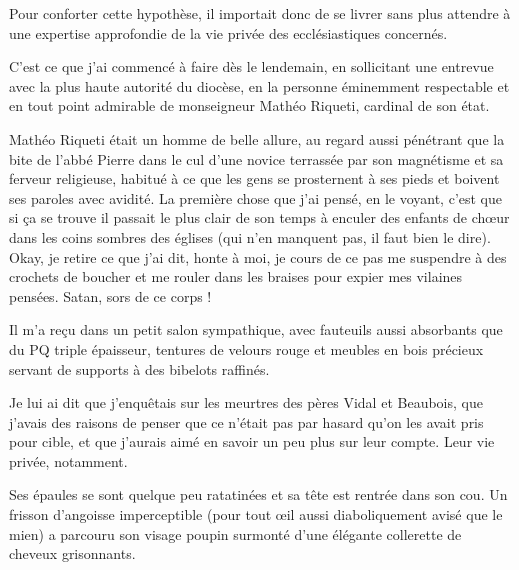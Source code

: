Pour conforter cette hypothèse, il importait donc de se livrer sans plus attendre à une expertise approfondie de la vie privée des ecclésiastiques concernés.

C’est ce que j’ai commencé à faire dès le lendemain, en sollicitant une entrevue avec la plus haute autorité du diocèse, en la personne éminemment respectable et en tout point admirable de monseigneur Mathéo Riqueti, cardinal de son état.

Mathéo Riqueti était un homme de belle allure, au regard aussi pénétrant que la bite de l’abbé Pierre dans le cul d’une novice terrassée par son magnétisme et sa ferveur religieuse, habitué à ce que les gens se prosternent à ses pieds et boivent ses paroles avec avidité. La première chose que j’ai pensé, en le voyant, c’est que si ça se trouve il passait le plus clair de son temps à enculer des enfants de chœur dans les coins sombres des églises (qui n’en manquent pas, il faut bien le dire). Okay, je retire ce que j’ai dit, honte à moi, je cours de ce pas me suspendre à des crochets de boucher et me rouler dans les braises pour expier mes vilaines pensées. Satan, sors de ce corps !

Il m’a reçu dans un petit salon sympathique, avec fauteuils aussi absorbants que du PQ triple épaisseur, tentures de velours rouge et meubles en bois précieux servant de supports à des bibelots raffinés.

Je lui ai dit que j’enquêtais sur les meurtres des pères Vidal et Beaubois, que j’avais des raisons de penser que ce n’était pas par hasard qu’on les avait pris pour cible, et que j’aurais aimé en savoir un peu plus sur leur compte. Leur vie privée, notamment.

Ses épaules se sont quelque peu ratatinées et sa tête est rentrée dans son cou. Un frisson d’angoisse imperceptible (pour tout œil aussi diaboliquement avisé que le mien) a parcouru son visage poupin surmonté d’une élégante collerette de cheveux grisonnants.

